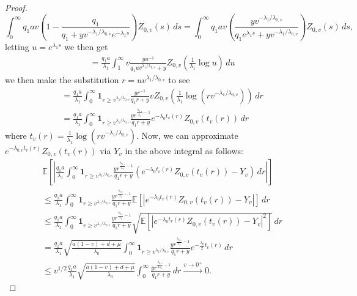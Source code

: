 \documentclass{article}
\numberwithin{equation}{section}
\begin{document}
\begin{proof}
  \[
  \int_0^\infty q_1 av\left(1-\frac{q_1}{q_1+yv^{-\lambda_1/\lambda_{0,v}}e^{-\lambda_1 s}}\right)Z_{0,v}(s)\,ds=\int_0^\infty q_1 av\left(\frac{yv^{-\lambda_1/\lambda_{0,v}}}{q_1e^{\lambda_1 s}+yv^{-\lambda_1/\lambda_{0,v}}}\right)Z_{0,v}(s)\,ds,
  \]
letting $u=e^{\lambda_1 s}$ we then get
\begin{align*}
  &=\frac{q_1a}{\lambda_1}\int_{1}^\infty v\frac{yu^{-1}}{q_1 uv^{\lambda_1/\lambda_{0,v}}+y}Z_{0,v}\left(\frac{1}{\lambda_1}\log u\right)\,du
\end{align*}
we then make the substitution $r=uv^{\lambda_1/\lambda_{0,v}}$ to see
\begin{align}
  &=\frac{q_1 a}{\lambda_1}\int_{0}^\infty \mathbf{1}_{r\geq v^{\lambda_1/\lambda_{0,v}}}\frac{yr^{-1}}{q_1 r+y}vZ_{0,v}\left(\frac{1}{\lambda_1}\log\left(rv^{-\lambda_1/\lambda_{0,v}}\right)\right)\,dr\nonumber\\
  &=\frac{q_1 a}{\lambda_1}\int_{0}^\infty \mathbf{1}_{r\geq v^{\lambda_1/\lambda_{0,v}}}\frac{yr^{\frac{\lambda_{0,v}}{\lambda_1}-1}}{q_1 r+y}e^{-\lambda_0 t_v(r)}Z_{0,v}\left(t_v(r)\right)\,dr\nonumber
\end{align}
where $t_v(r)=\frac{1}{\lambda_1}\log\left(rv^{-\lambda_1/\lambda_{0,v}}\right)$. Now, we can approximate $e^{-\lambda_{0,v}t_v(r)}Z_{0,v}(t_v(r))$ via $Y_v$ in the above integral as follows:
\begin{align*}
    &\mathbb{E}\left[\left|\frac{q_1 a}{\lambda_1}\int_{0}^\infty \mathbf{1}_{r\geq v^{\lambda_1/\lambda_{0,v}}}\frac{yr^{\frac{\lambda_{0,v}}{\lambda_1}-1}}{q_1 r+y}\left(e^{-\lambda_0 t_v(r)}Z_{0,v}\left(t_v(r)\right)-Y_v\right)\,dr\right|\right]\\
    &\leq \frac{q_1 a}{\lambda_1}\int_{0}^\infty \mathbf{1}_{r\geq v^{\lambda_1/\lambda_{0,v}}}\frac{yr^{\frac{\lambda_{0,v}}{\lambda_1}-1}}{q_1 r+y}\mathbb{E}\left[\left|e^{-\lambda_0 t_v(r)}Z_{0,v}\left(t_v(r)\right)-Y_v\right|\right]\,dr\\
    &\leq \frac{q_1 a}{\lambda_1}\int_{0}^\infty \mathbf{1}_{r\geq v^{\lambda_1/\lambda_{0,v}}}\frac{yr^{\frac{\lambda_{0,v}}{\lambda_1}-1}}{q_1 r+y}\sqrt{\mathbb{E}\left[\left|e^{-\lambda_0 t_v(r)}Z_{0,v}\left(t_v(r)\right)-Y_v\right|^2\right]}\,dr\\
    &= \frac{q_1 a}{\lambda_1}\sqrt{\frac{a(1-v)+d+\mu}{\lambda_0}}\int_{0}^\infty \mathbf{1}_{r\geq v^{\lambda_1/\lambda_{0,v}}}\frac{yr^{\frac{\lambda_{0,v}}{\lambda_1}-1}}{q_1 r+y}e^{-\frac{\lambda_0}{2}t_v(r)}\,dr\\
    &\leq  v^{1/2}\frac{q_1 a}{\lambda_1}\sqrt{\frac{a(1-v)+d+\mu}{\lambda_0}}\int_{0}^\infty\frac{yr^{\frac{\lambda_{0,v}}{2\lambda_1}-1}}{q_1 r+y}\,dr\overset{v\to 0^+}{\to} 0.

\end{align*}
\end{proof}
\end{document}

